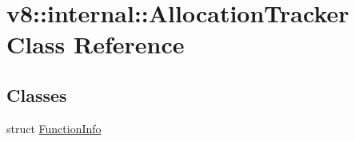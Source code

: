 \hypertarget{classv8_1_1internal_1_1AllocationTracker}{}\section{v8\+:\+:internal\+:\+:Allocation\+Tracker Class Reference}
\label{classv8_1_1internal_1_1AllocationTracker}
\subsection*{Classes}
\begin{DoxyCompactItemize}
\item 
struct \mbox{\hyperlink{structv8_1_1internal_1_1AllocationTracker_1_1FunctionInfo}{Function\+Info}}
\end{DoxyCompactItemize}
